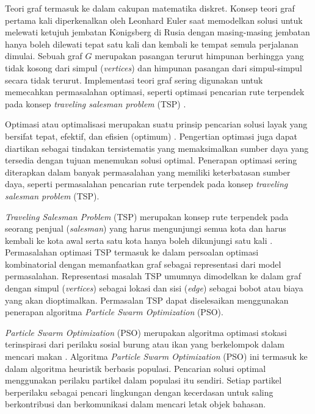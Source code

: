 {    %
    Teori graf termasuk ke dalam cakupan matematika diskret. Konsep teori graf pertama kali diperkenalkan oleh Leonhard Euler saat memodelkan solusi
    untuk melewati ketujuh jembatan K$\ddot{o}$nigsberg di Rusia dengan masing-masing jembatan hanya boleh dilewati tepat satu kali dan kembali ke tempat semula perjalanan dimulai.
    Sebuah graf $G$ merupakan pasangan terurut himpunan berhingga yang tidak kosong dari simpul (\textit{vertices}) dan himpunan pasangan dari simpul-simpul secara tidak terurut.
    Implementasi teori graf sering digunakan untuk memecahkan permasalahan optimasi, seperti optimasi pencarian rute terpendek pada konsep \textit{traveling salesman problem} (TSP) .

    Optimasi atau optimalisasi merupakan suatu prinsip pencarian solusi layak yang bersifat tepat, efektif, dan efisien (optimum) .
    Pengertian optimasi juga dapat diartikan sebagai tindakan tersistematis yang memaksimalkan sumber daya yang tersedia dengan tujuan menemukan solusi optimal.
    Penerapan optimasi sering diterapkan dalam banyak permasalahan yang memiliki keterbatasan sumber daya, seperti permasalahan pencarian rute terpendek pada konsep \textit{traveling salesman problem} (TSP).

    \textit{Traveling Salesman Problem} (TSP) merupakan konsep rute terpendek pada seorang penjual (\textit{salesman}) yang harus mengunjungi semua kota dan harus kembali ke kota awal serta satu kota hanya boleh dikunjungi satu kali .
    Permasalahan optimasi TSP termasuk ke dalam persoalan optimasi kombinatorial dengan memanfaatkan graf sebagai representasi dari model permasalahan.
    Representasi masalah TSP umumnya dimodelkan ke dalam graf dengan simpul (\textit{vertices}) sebagai lokasi dan sisi (\textit{edge}) sebagai bobot atau biaya yang akan dioptimalkan.
    Permasalan TSP dapat diselesaikan menggunakan penerapan algoritma \textit{Particle Swarm Optimization} (PSO).

    \textit{Particle Swarm Optimization} (PSO) merupakan algoritma optimasi stokasi terinspirasi dari perilaku sosial burung atau ikan yang berkelompok dalam mencari makan .
    Algoritma \textit{Particle Swarm Optimization} (PSO) ini termasuk ke dalam algoritma heuristik berbasis populasi.
    Pencarian solusi optimal menggunakan perilaku partikel dalam populasi itu sendiri.
    Setiap partikel berperilaku sebagai pencari lingkungan dengan kecerdasan untuk saling berkontribusi dan berkomunikasi dalam mencari letak objek bahasan.

}
